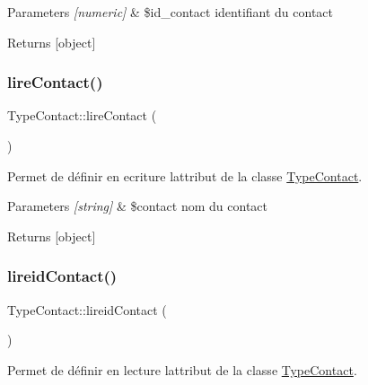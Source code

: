\begin{DoxyParams}{Parameters}
{\em \mbox{[}numeric\mbox{]}} & \$id\+\_\+contact identifiant du contact \\
\hline
\end{DoxyParams}
\begin{DoxyReturn}{Returns}
\mbox{[}object\mbox{]} 
\end{DoxyReturn}
\mbox{\label{class_type_contact_ac6cbf65706bad90e42fc9d18298f30c1}} 
\subsubsection{\texorpdfstring{lire\+Contact()}{lireContact()}}
{\footnotesize\ttfamily Type\+Contact\+::lire\+Contact (\begin{DoxyParamCaption}{ }\end{DoxyParamCaption})}



Permet de définir en ecriture l\textquotesingle{}attribut de la classe \hyperlink{class_type_contact}{Type\+Contact}. 


\begin{DoxyParams}{Parameters}
{\em \mbox{[}string\mbox{]}} & \$contact nom du contact \\
\hline
\end{DoxyParams}
\begin{DoxyReturn}{Returns}
\mbox{[}object\mbox{]} 
\end{DoxyReturn}
\mbox{\label{class_type_contact_a71484de1b3f2c85dfcc0454b422f95f6}} 
\subsubsection{\texorpdfstring{lireid\+Contact()}{lireidContact()}}
{\footnotesize\ttfamily Type\+Contact\+::lireid\+Contact (\begin{DoxyParamCaption}{ }\end{DoxyParamCaption})}



Permet de définir en lecture l\textquotesingle{}attribut de la classe \hyperlink{class_type_contact}{Type\+Contact}. 


